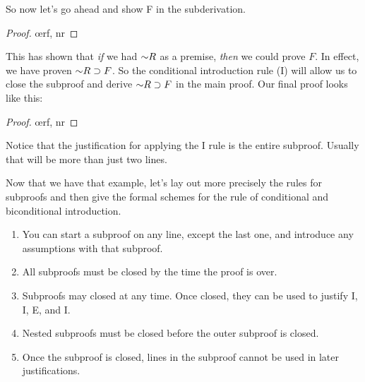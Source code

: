 So now let's go ahead and show F in the subderivation. 

\begin{proof}
	\open
		\oe{rf, nr}
	\close
\end{proof}

This has shown that \emph{if} we had $\mathord{\sim} R$ as a premise, \emph{then} we could prove $F$. In effect, we have proven $\mathord{\sim} R \supset F$. So the 
conditional introduction rule ({\eif}I) will allow us to close the subproof and derive $\mathord{\sim} R \supset F$ in the main proof. Our final proof looks like this:

\begin{proof}
	\open
		\oe{rf, nr}
	\close
\end{proof}

Notice that the justification for applying the {\eif}I rule is the entire subproof. Usually that will be more than just two lines.


Now that we have that example, let's lay out more precisely the rules for subproofs and then give the formal schemes for the rule of conditional and biconditional introduction. 

\begin{enumerate}[leftmargin=1.5cm]
\item[\define{Rule 1}] You can start a subproof on any line, except the last one, and introduce any assumptions with that subproof.
\item[\define{Rule 2}] All subproofs must be closed by the time the proof is over.
\item[\define{Rule 3}] Subproofs may closed at any time. Once closed, they can be used to justify \eif I, \eiff I, \enot E, and \enot I.
\item[\define{Rule 4}] Nested subproofs must be closed before the outer subproof is closed.
\item[\define{Rule 5}] Once the subproof is closed, lines in the subproof cannot be used in later justifications.
\end{enumerate}

